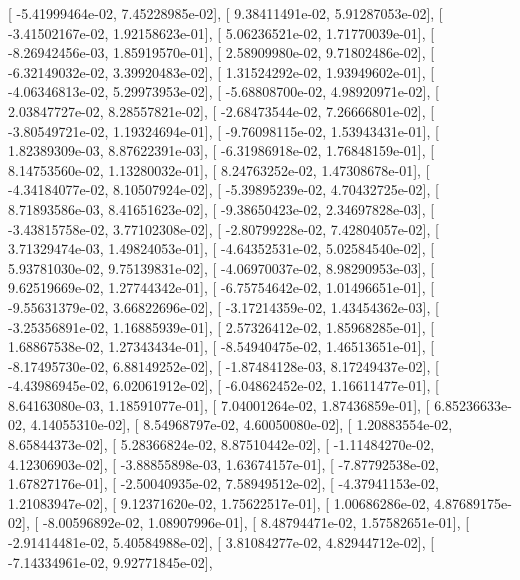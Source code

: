 \documentclass{article}
\begin{document}
       [ -5.41999464e-02,   7.45228985e-02],
       [  9.38411491e-02,   5.91287053e-02],
       [ -3.41502167e-02,   1.92158623e-01],
       [  5.06236521e-02,   1.71770039e-01],
       [ -8.26942456e-03,   1.85919570e-01],
       [  2.58909980e-02,   9.71802486e-02],
       [ -6.32149032e-02,   3.39920483e-02],
       [  1.31524292e-02,   1.93949602e-01],
       [ -4.06346813e-02,   5.29973953e-02],
       [ -5.68808700e-02,   4.98920971e-02],
       [  2.03847727e-02,   8.28557821e-02],
       [ -2.68473544e-02,   7.26666801e-02],
       [ -3.80549721e-02,   1.19324694e-01],
       [ -9.76098115e-02,   1.53943431e-01],
       [  1.82389309e-03,   8.87622391e-03],
       [ -6.31986918e-02,   1.76848159e-01],
       [  8.14753560e-02,   1.13280032e-01],
       [  8.24763252e-02,   1.47308678e-01],
       [ -4.34184077e-02,   8.10507924e-02],
       [ -5.39895239e-02,   4.70432725e-02],
       [  8.71893586e-03,   8.41651623e-02],
       [ -9.38650423e-02,   2.34697828e-03],
       [ -3.43815758e-02,   3.77102308e-02],
       [ -2.80799228e-02,   7.42804057e-02],
       [  3.71329474e-03,   1.49824053e-01],
       [ -4.64352531e-02,   5.02584540e-02],
       [  5.93781030e-02,   9.75139831e-02],
       [ -4.06970037e-02,   8.98290953e-03],
       [  9.62519669e-02,   1.27744342e-01],
       [ -6.75754642e-02,   1.01496651e-01],
       [ -9.55631379e-02,   3.66822696e-02],
       [ -3.17214359e-02,   1.43454362e-03],
       [ -3.25356891e-02,   1.16885939e-01],
       [  2.57326412e-02,   1.85968285e-01],
       [  1.68867538e-02,   1.27343434e-01],
       [ -8.54940475e-02,   1.46513651e-01],
       [ -8.17495730e-02,   6.88149252e-02],
       [ -1.87484128e-03,   8.17249437e-02],
       [ -4.43986945e-02,   6.02061912e-02],
       [ -6.04862452e-02,   1.16611477e-01],
       [  8.64163080e-03,   1.18591077e-01],
       [  7.04001264e-02,   1.87436859e-01],
       [  6.85236633e-02,   4.14055310e-02],
       [  8.54968797e-02,   4.60050080e-02],
       [  1.20883554e-02,   8.65844373e-02],
       [  5.28366824e-02,   8.87510442e-02],
       [ -1.11484270e-02,   4.12306903e-02],
       [ -3.88855898e-03,   1.63674157e-01],
       [ -7.87792538e-02,   1.67827176e-01],
       [ -2.50040935e-02,   7.58949512e-02],
       [ -4.37941153e-02,   1.21083947e-02],
       [  9.12371620e-02,   1.75622517e-01],
       [  1.00686286e-02,   4.87689175e-02],
       [ -8.00596892e-02,   1.08907996e-01],
       [  8.48794471e-02,   1.57582651e-01],
       [ -2.91414481e-02,   5.40584988e-02],
       [  3.81084277e-02,   4.82944712e-02],
       [ -7.14334961e-02,   9.92771845e-02],
\end{document}
